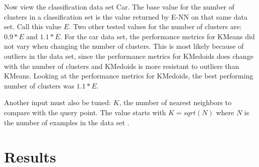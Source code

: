 \documentclass[twoside,11pt]{article}
\begin{document}
Now view the classification data set Car. The base value for the number of clusters in a classification set is the value returned by E-NN on that same data set. Call this value $E$. Two other tested values for the number of clusters are: $ 0.9 * E$ and $ 1.1 * E$.
For the car data set, the performance metrics for KMeans did not vary when changing the number of clusters. This is most likely because of outliers in the data set, since the performance metrics for KMedoids does change with the number of clusters and KMedoids is more resistant to outliers than KMeans.
Looking at the performance metrics for KMedoids, the best performing number of clusters was $1.1 * E$.

Another input must also be tuned: $K$, the number of nearest neighbors to compare with the query point. The value starts with $K = sqrt(N)$ where $N$ is the number of examples in the data set \citep{learning-k}.

\section{Results}
\end{document}
